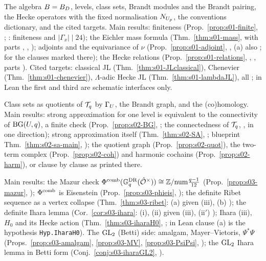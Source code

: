 \begin{description}[leftmargin=0pt,itemsep=4pt]
\item[Stage 01: quaternionic foundations.] The algebra $B=B_D$, levels, class sets, Brandt modules and the Brandt pairing, the
  Hecke operators with the fixed normalisation $N_{U_p}$, the conventions dictionary, and the cited targets. Main results: finiteness
  (Prop.~\ref{prop:s01-finite}, \stknown; \stformal{}: finiteness and $|\Gamma_x|\mid24$); the Eichler mass formula (Thm.~\ref{thm:s01-mass}, \stcited{} with parts \stproved,
  \stpmc, \stformal); adjoints and the equivariance of $\nu$ (Prop.~\ref{prop:s01-adjoint}, \stproved, (a) also \stcited; \stformal{} for the clauses marked there); the Hecke relations
  (Prop.~\ref{prop:s01-relations}, \stproved, \stformal, parts \stknown). Cited targets: classical JL (Thm.~\ref{thm:s01-JLclassical}), Chenevier
  (Thm.~\ref{thm:s01-chenevier}), $\Lambda$-adic Hecke JL (Thm.~\ref{thm:s01-lambdaJL}), all \stcited; in Lean the first and third are
  schematic interfaces only.
\item[Stage 02: tree quotients.] Class sets as quotients of $\mathcal{T}_q$ by $\Gamma_U$, the Brandt graph, and the (co)homology. Main results:
  strong approximation for one level is equivalent to the connectivity of $\mathrm{BG}(U,q)$, a finite check
  (Prop.~\ref{prop:s02-BG}, \stproved; the connectedness of $\mathcal{T}_q$, \stcited, in one direction); strong approximation itself
  (Thm.~\ref{thm:s02-SA}, \stcited; blueprint Thm.~\ref{thm:s02-sa-main}, \stpmc); the quotient graph
  (Prop.~\ref{prop:s02-quot}), the two-term complex (Prop.~\ref{prop:s02-coh}) and harmonic cochains (Prop.~\ref{prop:s02-harm}),
  \stproved{} or \stpmc{} clause by clause as printed there.
\item[Stage 03: weighted graphs, the definite Ribet sequence and the Ihara lemma.] Main results: the Mazur check
  $\Phi^{\mathrm{comb}}(\mathbb{G}^{\mathrm{DR}}_q(\hat{\mathcal{O}}^\times))\cong\mathbb{Z}/\mathrm{num}\frac{q-1}{12}$ (Prop.~\ref{prop:s03-mazur}, \stpmc); $\Phi^{\mathrm{comb}}$ is Eisenstein
  (Prop.~\ref{prop:s03-phieis}, \stproved); the definite Ribet sequence as a vertex collapse (Thm.~\ref{thm:s03-ribet}: (a) \stproved{}
  given (iii), (b) \stpmc); the definite Ihara lemma (Cor.~\ref{cor:s03-ihara}: (i), (ii) \stproved{} given (iii), (ii$'$) \stpmc);
  Ihara (iii), $H_0$ and its Hecke action (Thm.~\ref{thm:s03-iharaH0}, \stpmc; in Lean clause (a) is the hypothesis
  \texttt{Hyp.IharaH0}). The $\mathrm{GL}_2$ (Betti) side: amalgam, Mayer--Vietoris, $\Psi^*\Psi$ (Props.~\ref{prop:s03-amalgam},
  \ref{prop:s03-MV}, \ref{prop:s03-PsiPsi}, \stpmc); the $\mathrm{GL}_2$ Ihara lemma in Betti form (Conj.~\ref{conj:s03-iharaGL2}, \stexp).

\end{description}
